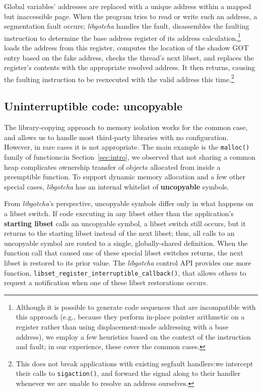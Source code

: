 
Global variables' addresses are replaced with a unique address within a mapped but
inaccessible page.  When the program tries to read or write such an address, a
segmentation fault occurs; \textit{libgotcha} handles the fault, disassembles the
faulting instruction to determine the base address register of its address
calculation,\footnote{Although it is possible to
generate code sequences that are incompatible with this approach (e.g., because they
perform in-place pointer arithmetic on a register rather than using displacement-mode
addressing with a base address), we employ a few heuristics based on the context of
the instruction and fault; in our experience, these cover the common cases.}
loads the address from this register, computes the location of the
shadow GOT entry based on the fake address, checks the thread's next libset, and
replaces the register's contents with the appropriate resolved address.  It then
returns, causing the faulting instruction to be reexecuted with the valid address
this time.\footnote{This does not break applications with existing segfault
handlers:\@ we intercept their calls to \texttt{sigaction()}, and forward the signal
along to their handler whenever we are unable to resolve an address ourselves.}



\subsection{Uninterruptible code: uncopyable}
\label{sec:uncopyable}

The library-copying approach to memory isolation works for the common case, and
allows us to handle most third-party libraries with no configuration.  However, in
rare cases it is not appropriate.  The main example is the \texttt{malloc()} family
of functions:\@ in Section~\ref{sec:intro}, we observed that not sharing a common
heap complicates ownership transfer of objects allocated from inside a preemptible
function.  To support dynamic memory allocation and a few other special cases,
\textit{libgotcha} has an internal whitelist of \textbf{uncopyable} symbols.

From \textit{libgotcha}'s perspective, uncopyable symbols differ only in what
happens on a libset switch.  If code executing in any libset other than the
application's \textbf{starting libset} calls an uncopyable symbol, a libset
switch still occurs, but it returns to the starting libset instead of the next
libset; thus, all calls to an uncopyable symbol are routed to a single,
globally-shared definition.  When the function call that caused one of these special
libset switches returns, the next libset is restored to its prior value.  The
\textit{libgotcha} control API provides one more function,
\texttt{libset\_register\_interruptible\_callback()}, that allows others to request
a notification when one of these libset restorations occurs.


